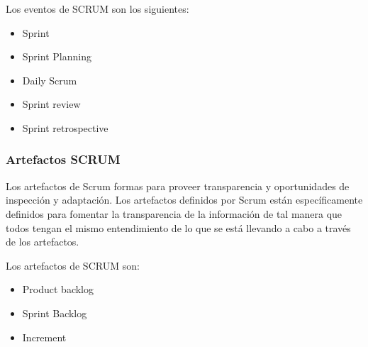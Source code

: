 \documentclass[a4paper, 12pt]{article}
\begin{document}
				Los eventos de SCRUM son los siguientes:
				
				\begin{itemize}
					\item Sprint 
					\item Sprint Planning
					\item Daily Scrum
					\item Sprint review
					\item Sprint retrospective
				\end{itemize}
			\subsubsection{Artefactos SCRUM}
				Los artefactos de Scrum formas para proveer transparencia y oportunidades de inspección y adaptación. Los artefactos definidos por Scrum están específicamente definidos para fomentar la transparencia de la información de tal manera que todos tengan el mismo entendimiento
				de lo que se está llevando a cabo a través de los artefactos.
				
				Los artefactos de SCRUM son:
				
				\begin{itemize}
					\item Product backlog 
					\item Sprint Backlog
					\item Increment
				\end{itemize}
\end{document}

